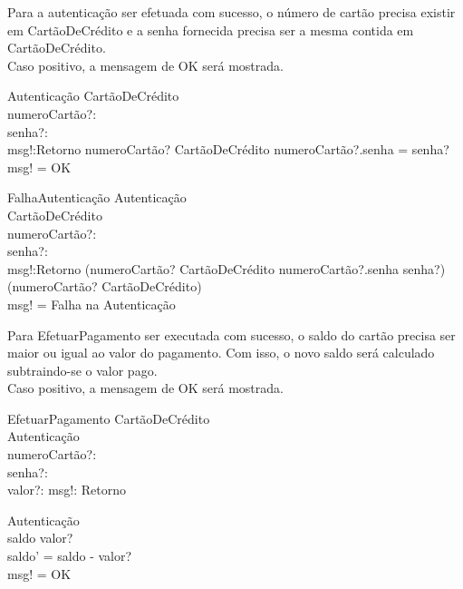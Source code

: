 \documentclass{article}
\begin{document}
\pagebreak

Para a autenticação ser efetuada com sucesso, o número de cartão precisa existir em CartãoDeCrédito e a senha fornecida precisa ser a mesma contida em CartãoDeCrédito.\\
Caso positivo, a mensagem de OK será mostrada.
\begin{schema}{Autenticação}
    \Xi CartãoDeCrédito\\
    numeroCartão?: \nat\\
    senha?: \nat\\
    msg!:Retorno
\where
    numeroCartão? \in CartãoDeCrédito \land numeroCartão?.senha = senha?\\
    msg! = OK
    
\end{schema}

\begin{schema}{FalhaAutenticação}
    \Xi Autenticação\\
    \Xi CartãoDeCrédito\\
    numeroCartão?: \nat\\
    senha?: \nat\\
    msg!:Retorno
\where
    (numeroCartão? \in CartãoDeCrédito \land numeroCartão?.senha \neq senha?) \lor\\
    (numeroCartão? \nin CartãoDeCrédito)\\
    msg! = Falha na Autenticação
    
\end{schema}

Para EfetuarPagamento ser executada com sucesso, o saldo do cartão precisa ser maior ou igual ao valor do pagamento. Com isso, o novo saldo será calculado subtraindo-se o valor pago.\\
Caso positivo, a mensagem de OK será mostrada.

\begin{schema}{EfetuarPagamento}
    \Delta CartãoDeCrédito\\
    \Xi Autenticação\\
    numeroCartão?: \nat\\
    senha?: \nat\\
    valor?: \real
    msg!: Retorno

    \where
    \Xi Autenticação\\
    saldo \geq valor?\\
    saldo' = saldo - valor?\\
    msg! = OK
    
\end{schema}
\end{document}

